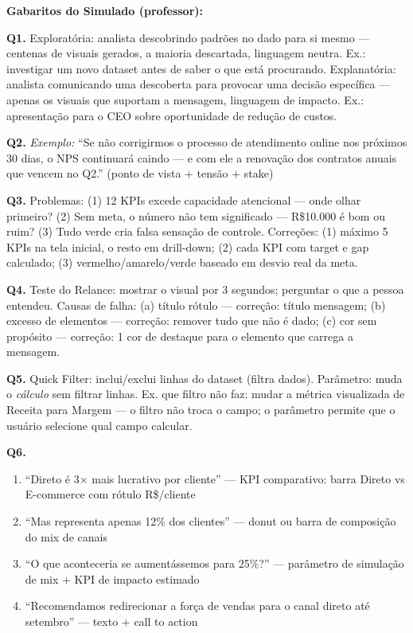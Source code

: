 \begin{SolvedBox}
\textbf{Gabaritos do Simulado (professor):}

\textbf{Q1.} Exploratória: analista descobrindo padrões no dado para si mesmo —
centenas de visuais gerados, a maioria descartada, linguagem neutra. Ex.: investigar um
novo dataset antes de saber o que está procurando. Explanatória: analista
comunicando uma descoberta para provocar uma decisão específica — apenas os
visuais que suportam a mensagem, linguagem de impacto. Ex.: apresentação para
o CEO sobre oportunidade de redução de custos.

\textbf{Q2.} \textit{Exemplo:} ``Se não corrigirmos o processo de atendimento online
nos próximos 30 dias, o NPS continuará caindo — e com ele a renovação dos contratos
anuais que vencem no Q2.'' (ponto de vista + tensão + stake)

\textbf{Q3.} Problemas: (1) 12 KPIs excede capacidade atencional — onde olhar primeiro?
(2) Sem meta, o número não tem significado — R\$10.000 é bom ou ruim? (3) Tudo verde
cria falsa sensação de controle. Correções: (1) máximo 5 KPIs na tela inicial, o resto em
drill-down; (2) cada KPI com target e gap calculado; (3) vermelho/amarelo/verde baseado
em desvio real da meta.

\textbf{Q4.} Teste do Relance: mostrar o visual por 3 segundos; perguntar o que a pessoa
entendeu. Causas de falha: (a) título rótulo — correção: título mensagem; (b) excesso de
elementos — correção: remover tudo que não é dado; (c) cor sem propósito — correção:
1 cor de destaque para o elemento que carrega a mensagem.

\textbf{Q5.} Quick Filter: inclui/exclui linhas do dataset (filtra dados). Parâmetro:
muda o \emph{cálculo} sem filtrar linhas. Ex. que filtro não faz: mudar a métrica
visualizada de Receita para Margem — o filtro não troca o campo; o parâmetro permite
que o usuário selecione qual campo calcular.

\textbf{Q6.}
\begin{enumerate}
  \item ``Direto é 3× mais lucrativo por cliente'' — KPI comparativo: barra Direto vs E-commerce com rótulo R\$/cliente
  \item ``Mas representa apenas 12\% dos clientes'' — donut ou barra de composição do mix de canais
  \item ``O que aconteceria se aumentássemos para 25\%?'' — parâmetro de simulação de mix + KPI de impacto estimado
  \item ``Recomendamos redirecionar a força de vendas para o canal direto até setembro'' — texto + call to action
\end{enumerate}


\end{SolvedBox}
